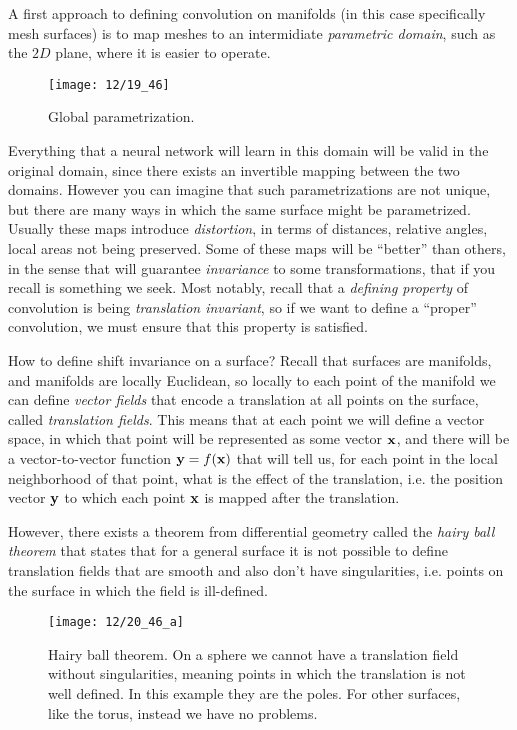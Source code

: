 
A first approach to defining convolution on manifolds (in this case specifically mesh surfaces) is to map meshes to an intermidiate \emph{parametric domain}, such as the $2D$ plane, where it is easier to operate.

\begin{figure}[H]
	\centering
	\texttt{[image: 12/19\_46]}
	\caption{Global parametrization.}\label{fig:param}	
\end{figure}

Everything that a neural network will learn in this domain will be valid in the original domain, since there exists an invertible mapping between the two domains. However you can imagine that such parametrizations are not unique, but there are many ways in which the same surface might be parametrized. Usually these maps introduce \emph{distortion}, in terms of distances, relative angles, local areas not being preserved. Some of these maps will be ``better'' than others, in the sense that will guarantee \emph{invariance} to some transformations, that if you recall is something we seek. Most notably, recall that a \emph{defining property} of convolution is being \emph{translation invariant}, so if we want to define a ``proper'' convolution, we must ensure that this property is satisfied. 

How to define shift invariance on a surface? Recall that surfaces are manifolds, and manifolds are locally Euclidean, so locally to each point of the manifold we can define \emph{vector fields} that encode a translation at all points on the surface, called \emph{translation fields}. This means that at each point we will define a vector space, in which that point will be represented as some vector $\vb{x}$, and there will be a vector-to-vector function $\vb{y} = f(\vb{x})$ that will tell us, for each point in the local neighborhood of that point, what is the effect of the translation, i.e. the position vector $\vb{y}$ to which each point $\vb{x}$ is mapped after the translation.

However, there exists a theorem from differential geometry called the \emph{hairy ball theorem} that states that for a general surface it is not possible to define translation fields that are smooth and also don't have singularities, i.e. points on the surface in which the field is ill-defined. 
\begin{figure}[H]
	\centering
	\texttt{[image: 12/20\_46\_a]}
	\caption{Hairy ball theorem. On a sphere we cannot have a translation field without singularities, meaning points in which the translation is not well defined. In this example they are the poles. For other surfaces, like the torus, instead we have no problems.}\label{fig:hairy-ball}	
\end{figure}

